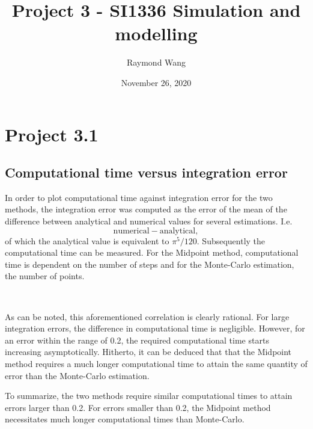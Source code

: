 \documentclass[12pt]{article}
\title{Project 3 - SI1336 Simulation and modelling}
\author{Raymond Wang}
\date{November 26, 2020}
\begin{document}
\maketitle
\newpage
\section*{Project 3.1}
\subsection*{Computational time versus integration error}
In order to plot computational time against integration error for the two methods, the integration error was computed as the error of the mean of the difference between analytical and numerical values for several estimations. I.e. 
\begin{equation*}
\text{numerical} - \text{analytical},
\end{equation*}
of which the analytical value is equivalent to $\pi^5/120$. Subsequently the computational time can be measured. For the Midpoint method, computational time is dependent on the number of steps and for the Monte-Carlo estimation, the number of points. 
\begin{figure*}[ht!]
\begin{center}
   \\
   \caption{\label{workflow} (a) Midpoint method (b) Monte Carlo estimation}
\end{center}
\end{figure*}

\noindent As can be noted, this aforementioned correlation is clearly rational. For large integration errors, the difference in computational time is negligible. However, for an error within the range of 0.2, the required computational time starts increasing asymptotically. Hitherto, it can be deduced that that the Midpoint method requires a much longer computational time to attain the same quantity of error than the Monte-Carlo estimation. 
\vspace{0.3cm}

\noindent To summarize, the two methods require similar computational times to attain errors larger than 0.2. For errors smaller than 0.2, the Midpoint method necessitates much longer computational times than Monte-Carlo.
\end{document}

